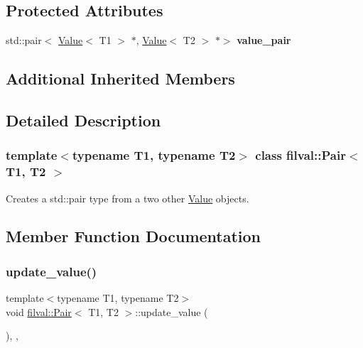 \subsection*{Protected Attributes}
\begin{DoxyCompactItemize}
\item 
\hypertarget{classfilval_1_1Pair_a7d4574acdae8ac0d4af1b3733173b3c7}{}\label{classfilval_1_1Pair_a7d4574acdae8ac0d4af1b3733173b3c7} 
std\+::pair$<$ \hyperlink{classfilval_1_1Value}{Value}$<$ T1 $>$ $\ast$, \hyperlink{classfilval_1_1Value}{Value}$<$ T2 $>$ $\ast$$>$ {\bfseries value\+\_\+pair}
\end{DoxyCompactItemize}
\subsection*{Additional Inherited Members}


\subsection{Detailed Description}
\subsubsection*{template$<$typename T1, typename T2$>$\newline
class filval\+::\+Pair$<$ T1, T2 $>$}

Creates a std\+::pair type from a two other \hyperlink{classfilval_1_1Value}{Value} objects. 

\subsection{Member Function Documentation}
\hypertarget{classfilval_1_1Pair_a1dd5b3859d023821081659cc8a66bda4}{}\label{classfilval_1_1Pair_a1dd5b3859d023821081659cc8a66bda4} 
\subsubsection{\texorpdfstring{update\+\_\+value()}{update\_value()}}
{\footnotesize\ttfamily template$<$typename T1, typename T2$>$ \\
void \hyperlink{classfilval_1_1Pair}{filval\+::\+Pair}$<$ T1, T2 $>$\+::update\+\_\+value (\begin{DoxyParamCaption}{ }\end{DoxyParamCaption})\hspace{0.3cm}{\ttfamily [inline]}, {\ttfamily [protected]}, {\ttfamily [virtual]}}



